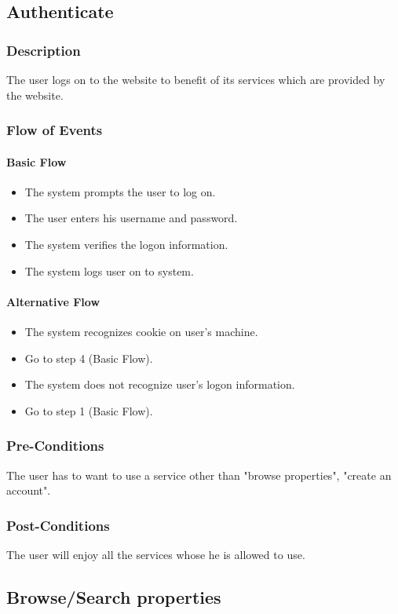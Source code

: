 \documentclass[a4paper,12pt]{article}
\begin{document}
\subsection{Authenticate}
\subsubsection{Description}
The user logs on to the website to benefit of its services which are provided by the website.
\subsubsection{Flow of Events}
\paragraph{Basic Flow}
\begin{itemize}
\item The system prompts the user to log on.
\item The user enters his username and password. 
\item The system verifies the logon information. 
\item The system logs user on to system.
\end{itemize}
\paragraph{Alternative Flow}
\begin{itemize}
\item The system recognizes cookie on user's machine. 
\item Go to step 4 (Basic Flow).
\item The system does not recognize user's logon information.
\item Go to step 1 (Basic Flow).
\end{itemize}
\subsubsection{Pre-Conditions}
The user has to want to use a service other than "browse properties", "create an account".
\subsubsection{Post-Conditions}
The user will enjoy all the services whose he is allowed to use.

\subsection{Browse/Search properties}
\end{document}
